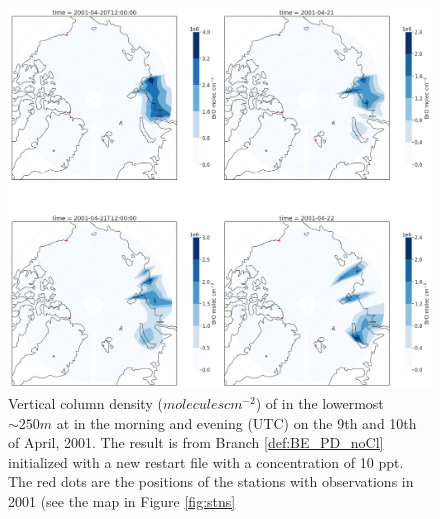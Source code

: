 \begin{figure}[ht]
    \centering
    \includegraphics[width=\linewidth]{Chapter6_Results/images/polarBro_newRestart.png}
    \caption{Vertical column density ($molecules cm^{-2}$) of  in the lowermost $\sim 250 m$ at in the morning and evening (UTC) on the 9th and 10th of April, 2001. The result is from Branch \ref{def:BE_PD_noCl} initialized with a new restart file with a  concentration of 10 ppt. The red dots are the positions of the stations with observations in 2001 (see the map in Figure \ref{fig:stns}}
    \label{fig:polarBro_newRestart}
\end{figure}